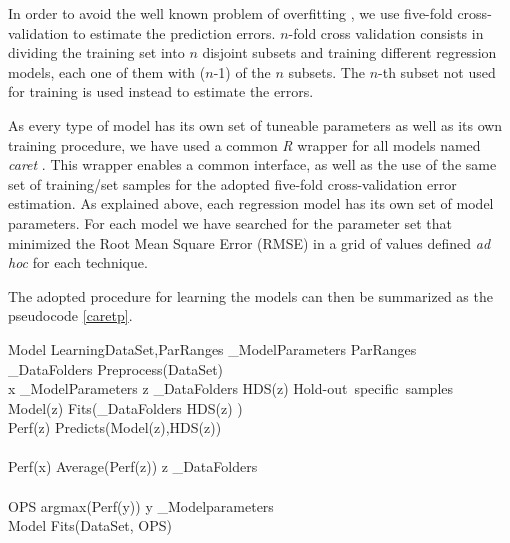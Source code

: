 In order to avoid the well known problem of overfitting \cite[see
e.g.][]{Dietterich:1995:OUM:212094.212114}, we use five-fold
cross-validation to estimate the prediction errors. $n$-fold cross
validation consists in dividing the training set into $n$ disjoint
subsets and training different regression models, each one of them
with ($n$-1) of the $n$ subsets. The $n$-th subset not used for
training is used instead to estimate the errors.

As every type of model has its own set of tuneable parameters as well
as its own training procedure, we have used a common {\sl R}
\citep{R2016} wrapper for all models named {\sl caret} \citep[short for
Classification And REgression Training][]{caret}.  This wrapper
enables a common interface, as well as the use of the same set of
training/set samples for the adopted five-fold cross-validation error
estimation. As explained above, each regression model has its own set
of model parameters. For each model we have searched for the parameter
set that minimized the Root Mean Square Error (RMSE) in a grid of
values defined {\it ad hoc} for each technique.

The adopted procedure for learning the models can then be summarized
as the pseudocode \ref{caretp}. 

\begin{pseudocode}[plain]{Model Learning}{DataSet,ParRanges}
\label{caretp}
 _{ModelParameters} \GETS ParRanges \\
 _{DataFolders} \GETS Preprocess(DataSet) \\ 
 \FOREACH x \in {}_{ModelParameters} \DO
  \BEGIN
    \FOREACH z \in {}_{DataFolders} \DO
      \BEGIN
	HDS(z) \GETS \mbox{Hold-out specific samples} \\
	Model(z) \GETS Fits(_{DataFolders} \setminus HDS(z) ) \\
	Perf(z) \GETS Predicts(Model(z),HDS(z)) \\
      \END \\
    Perf(x) \GETS Average(Perf(z)) \quad \forall z \in {}_{DataFolders} \\
  \END \\
  
  OPS \GETS argmax(Perf(y)) \quad \forall y \in {}_{Modelparameters} \\
  Model \GETS Fits(DataSet, OPS) \\
\end{pseudocode}

